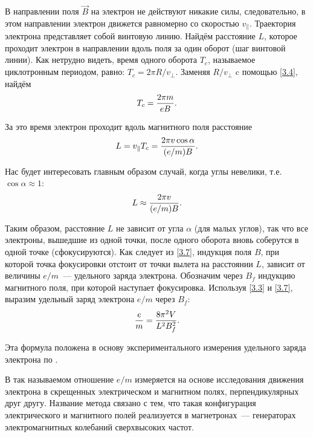 В направлении поля $\vec{B}$ на электрон не действуют никакие силы, следовательно, в этом направлении электрон движется равномерно со скоростью $v_{\parallel}$. Траектория электрона представляет собой винтовую линию. Найдём расстояние $L$, которое проходит электрон в направлении вдоль поля за один оборот (шаг винтовой линии). Как нетрудно видеть, время одного оборота $T_c$, называемое циклотронным периодом, равно: $T_c=2\pi R/v_{\bot}$. Заменяя $R/v_{\bot}$ c помощью \eqref{3.4}, найдём
\begin{equation}
	\eqmark{3.5}
	T_c =\frac{2\pi m}{eB}.
\end{equation}

За это время электрон проходит вдоль магнитного поля расстояние
\begin{equation}
	\eqmark{3.6}
	L = v_{\parallel}T_c =\frac{2\pi v\cos\alpha}{(e/m)B}.
\end{equation}

Нас будет интересовать главным образом случай, когда углы невелики, т.е. $\cos\alpha \approx 1$:
\begin{equation}
	\eqmark{3.7}
	L \approx \frac{2\pi v}{(e/m)B}.
\end{equation}

Таким образом, расстояние $L$ не зависит от угла $\alpha$ (для малых углов), так что все электроны, вышедшие из одной точки, после одного оборота вновь соберутся в одной точке (сфокусируются). Как следует из \eqref{3.7}, индукция поля $B$, при которой точка фокусировки отстоит от точки вылета на расстоянии $L$, зависит от величины $e/m$~--- удельного заряда электрона. Обозначим через $B_f$ индукцию магнитного поля, при которой наступает фокусировка. Используя \eqref{3.3} и \eqref{3.7}, выразим удельный заряд электрона $e/m$ через $B_f$:
\begin{equation}
	\eqmark{3.8}
\frac{e}{m}=\frac{8\pi^2 V}{L^2B_f^2}.
\end{equation}

Эта формула положена в основу экспериментального измерения удельного заряда электрона по .
\label{magnetic focusing}

В так называемом {} отношение $e/m$ измеряется на основе исследования движения электрона в скрещенных электрическом и магнитном полях, перпендикулярных друг другу. Название метода связано с тем, что такая
конфигурация электрического и магнитного полей реализуется в магнетронах~--- генераторах электромагнитных колебаний
сверхвысоких частот.

